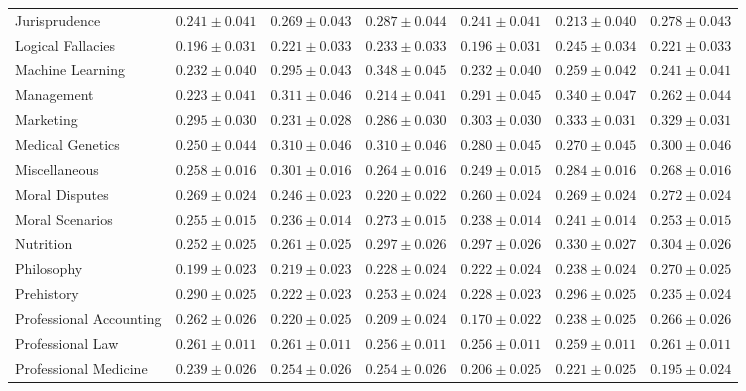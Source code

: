 \documentclass[11pt]{article}
\begin{document}
{\begin{landscape}
\begin{table}
\begin{tabular}{l c c c c c c }
Jurisprudence & $0.241 \pm 0.041$ & $0.269 \pm 0.043$ & $0.287 \pm 0.044$ & $0.241 \pm 0.041$ & $0.213 \pm 0.040$ & $0.278 \pm 0.043$ \\
Logical Fallacies & $0.196 \pm 0.031$ & $0.221 \pm 0.033$ & $0.233 \pm 0.033$ & $0.196 \pm 0.031$ & $0.245 \pm 0.034$ & $0.221 \pm 0.033$ \\ 
Machine Learning & $0.232 \pm 0.040$ & $0.295 \pm 0.043$ & $0.348 \pm 0.045$ & $0.232 \pm 0.040$ & $0.259 \pm 0.042$ & $0.241 \pm 0.041$ \\ 
Management & $0.223 \pm 0.041$ & $0.311 \pm 0.046$ & $0.214 \pm 0.041$ & $0.291 \pm 0.045$ & $0.340 \pm 0.047$ & $0.262 \pm 0.044$ \\ 
Marketing & $0.295 \pm 0.030$ & $0.231 \pm 0.028$ & $0.286 \pm 0.030$ & $0.303 \pm 0.030$ & $0.333 \pm 0.031$ & $0.329 \pm 0.031$ \\ 
Medical Genetics & $0.250 \pm 0.044$ & $0.310 \pm 0.046$ & $0.310 \pm 0.046$ & $0.280 \pm 0.045$ & $0.270 \pm 0.045$ & $0.300 \pm 0.046$ \\ 
Miscellaneous & $0.258 \pm 0.016$ & $0.301 \pm 0.016$ & $0.264 \pm 0.016$ & $0.249 \pm 0.015$ & $0.284 \pm 0.016$ & $0.268 \pm 0.016$ \\ 
Moral Disputes & $0.269 \pm 0.024$ & $0.246 \pm 0.023$ & $0.220 \pm 0.022$ & $0.260 \pm 0.024$ & $0.269 \pm 0.024$ & $0.272 \pm 0.024$ \\ 
Moral Scenarios & $0.255 \pm 0.015$ & $0.236 \pm 0.014$ & $0.273 \pm 0.015$ & $0.238 \pm 0.014$ & $0.241 \pm 0.014$ & $0.253 \pm 0.015$ \\ 
Nutrition & $0.252 \pm 0.025$ & $0.261 \pm 0.025$ & $0.297 \pm 0.026$ & $0.297 \pm 0.026$ & $0.330 \pm 0.027$ & $0.304 \pm 0.026$ \\ 
Philosophy & $0.199 \pm 0.023$ & $0.219 \pm 0.023$ & $0.228 \pm 0.024$ & $0.222 \pm 0.024$ & $0.238 \pm 0.024$ & $0.270 \pm 0.025$ \\ 
Prehistory & $0.290 \pm 0.025$ & $0.222 \pm 0.023$ & $0.253 \pm 0.024$ & $0.228 \pm 0.023$ & $0.296 \pm 0.025$ & $0.235 \pm 0.024$ \\ 
Professional Accounting & $0.262 \pm 0.026$ & $0.220 \pm 0.025$ & $0.209 \pm 0.024$ & $0.170 \pm 0.022$ & $0.238 \pm 0.025$ & $0.266 \pm 0.026$ \\ 
Professional Law & $0.261 \pm 0.011$ & $0.261 \pm 0.011$ & $0.256 \pm 0.011$ & $0.256 \pm 0.011$ & $0.259 \pm 0.011$ & $0.261 \pm 0.011$ \\ 
Professional Medicine & $0.239 \pm 0.026$ & $0.254 \pm 0.026$ & $0.254 \pm 0.026$ & $0.206 \pm 0.025$ & $0.221 \pm 0.025$ & $0.195 \pm 0.024$ \\ 

\end{tabular}
\end{table}
\end{landscape}}
\end{document}
